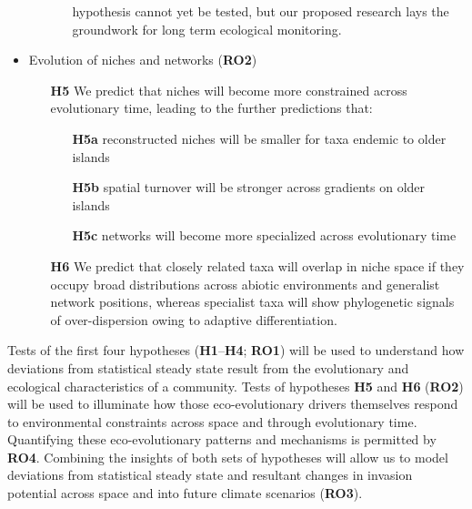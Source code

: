 \documentclass[11pt]{article}
\begin{document}
\begin{itemize}
\begin{itemize}
\begin{itemize}
      hypothesis cannot yet be tested, but our proposed research lays
      the groundwork for long term ecological monitoring.
    \end{itemize}
  \end{itemize}
\item Evolution of niches and networks ({\bf RO2})
  \begin{itemize}
  \item[{\bf H5}] We predict that niches will become more constrained
    across evolutionary time, leading to the further predictions that:
    \begin{itemize}
    \item[{\bf H5a}] reconstructed niches will be smaller for taxa endemic to older islands
    \item[{\bf H5b}] spatial turnover will be stronger across gradients on older islands
    \item[{\bf H5c}] networks will become more specialized across
      evolutionary time \citep[supported by our previous work on
      network evolution][]{rominger2015}
    \end{itemize}
  \item[{\bf H6}] We predict that closely related taxa will overlap in
    niche space if they occupy broad distributions across abiotic
    environments and generalist network positions, whereas specialist
    taxa will show phylogenetic signals of over-dispersion owing to
    adaptive differentiation.
  \end{itemize}
\end{itemize}

Tests of the first four hypotheses ({\bf H1}--{\bf H4}; {\bf RO1})
will be used to understand how deviations from statistical steady
state result from the evolutionary and ecological characteristics of a
community.  Tests of hypotheses {\bf H5} and {\bf H6} ({\bf RO2}) will
be used to illuminate how those eco-evolutionary drivers themselves
respond to environmental constraints across space and through
evolutionary time.  Quantifying these eco-evolutionary patterns and
mechanisms is permitted by {\bf RO4}. Combining the insights of both
sets of hypotheses will allow us to model deviations from statistical
steady state and resultant changes in invasion potential across space
and into future climate scenarios ({\bf RO3}).
\end{document}
